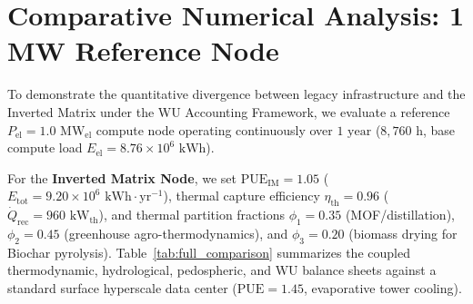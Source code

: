 \documentclass[aps,pre,twocolumn,10pt,superscriptaddress,amsmath,amssymb,amsfonts,floatfix,showkeys]{revtex4-2}
\begin{document}
\section{Comparative Numerical Analysis: 1 MW Reference Node}

To demonstrate the quantitative divergence between legacy infrastructure and the Inverted Matrix under the WU Accounting Framework, we evaluate a reference $P_{\text{el}} = 1.0\text{ MW}_{\text{el}}$ compute node operating continuously over $1\text{ year}$ ($8{,}760\text{ h}$, base compute load $E_{\text{el}} = 8.76 \times 10^6\text{ kWh}$).

For the \textbf{Inverted Matrix Node}, we set $\text{PUE}_{\text{IM}} = 1.05$ ($E_{\text{tot}} = 9.20 \times 10^6\text{ kWh}\cdot\text{yr}^{-1}$), thermal capture efficiency $\eta_{\text{th}} = 0.96$ ($\dot{Q}_{\text{rec}} = 960\text{ kW}_{\text{th}}$), and thermal partition fractions $\phi_1 = 0.35$ (MOF/distillation), $\phi_2 = 0.45$ (greenhouse agro-thermodynamics), and $\phi_3 = 0.20$ (biomass drying for Biochar pyrolysis). Table~\ref{tab:full_comparison} summarizes the coupled thermodynamic, hydrological, pedospheric, and $\text{WU}$ balance sheets against a standard surface hyperscale data center ($\text{PUE} = 1.45$, evaporative tower cooling).
\end{document}
